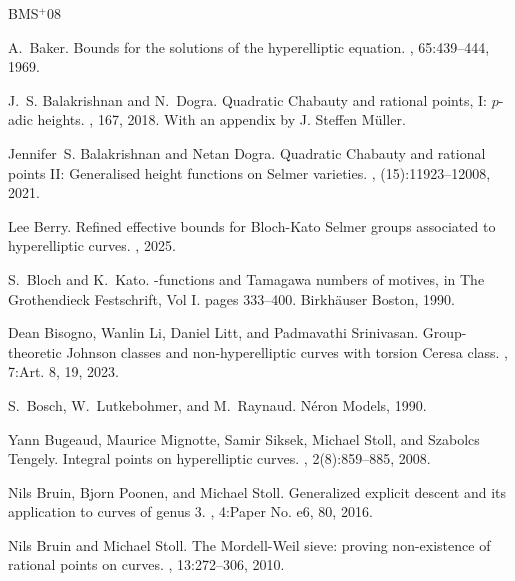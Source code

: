 \documentclass[11pt]{amsart}
\theoremstyle{plain}
\theoremstyle{definition}
\begin{document}
\newcommand{\etalchar}[1]{$^{#1}$}
\begin{thebibliography}{BMS{\etalchar{+}}08}

A.~Baker.
\newblock Bounds for the solutions of the hyperelliptic equation.
, 65:439--444, 1969.

J.~S. Balakrishnan and N.~Dogra.
\newblock Quadratic {C}habauty and rational points, {I}: {$p$}-adic heights.
, 167, 2018.
\newblock With an appendix by J. Steffen M\"{u}ller.

Jennifer~S. Balakrishnan and Netan Dogra.
\newblock Quadratic {C}habauty and rational points {II}: {G}eneralised height functions on {S}elmer varieties.
, (15):11923--12008, 2021.

Lee Berry.
\newblock Refined effective bounds for {B}loch-{K}ato {S}elmer groups associated to hyperelliptic curves.
, 2025.

S.~Bloch and K.~Kato.
-functions and {T}amagawa numbers of motives, in {T}he {G}rothendieck {F}estschrift, {V}ol {I}.
\newblock pages 333--400. Birkh\"auser Boston, 1990.

Dean Bisogno, Wanlin Li, Daniel Litt, and Padmavathi Srinivasan.
\newblock Group-theoretic {J}ohnson classes and non-hyperelliptic curves with torsion {C}eresa class.
, 7:Art. 8, 19, 2023.

S.~Bosch, W.~Lutkebohmer, and M.~Raynaud.
\newblock N{\'e}ron {M}odels, 1990.

\bibitem[BMS{\etalchar{+}}08]{BMSST}
Yann Bugeaud, Maurice Mignotte, Samir Siksek, Michael Stoll, and Szabolcs Tengely.
\newblock Integral points on hyperelliptic curves.
, 2(8):859--885, 2008.

Nils Bruin, Bjorn Poonen, and Michael Stoll.
\newblock Generalized explicit descent and its application to curves of genus 3.
, 4:Paper No. e6, 80, 2016.

Nils Bruin and Michael Stoll.
\newblock The {M}ordell-{W}eil sieve: proving non-existence of rational points on curves.
, 13:272--306, 2010.


\end{thebibliography}
\end{document}
